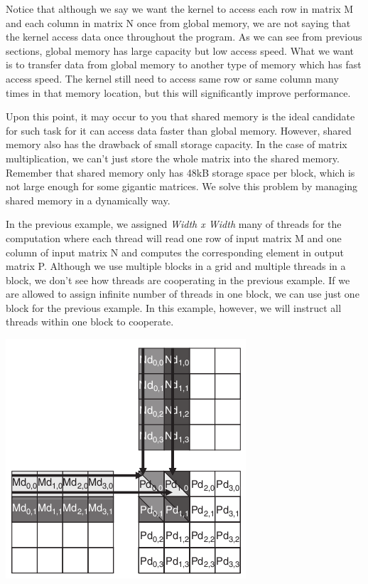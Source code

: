 \documentclass[letterpaper,10pt,english]{sphinxmanual}
\begin{document}
Notice that although we say we want the kernel to access each row in matrix M and each column in matrix N once from global memory, we are not saying that the kernel access data once throughout the program. As we can see from previous sections, global memory has large capacity but low access speed. What we want is to transfer data from global memory to another type of memory which has fast access speed. The kernel still need to access same row or same column many times in that memory location, but this will significantly improve performance.

Upon this point, it may occur to you that shared memory is the ideal candidate for such task for it can access data faster than global memory. However, shared memory also has the drawback of small storage capacity. In the case of matrix multiplication, we can't just store the whole matrix into the shared memory. Remember that shared memory only has 48kB storage space per block, which is not large enough for some gigantic matrices. We solve this problem by managing shared memory in a dynamically way.

In the previous example, we assigned \emph{Width x Width} many of threads for the computation where each thread will read one row of input matrix M and one column of input matrix N and computes the corresponding element in output matrix P. Although we use multiple blocks in a grid and multiple threads in a block, we don't see how threads are cooperating in the previous example. If we are allowed to assign infinite number of threads in one block, we can use just one block for the previous example. In this example, however, we will instruct all threads within one block to cooperate.

{\hfill\includegraphics{MMSM1.png}\hfill}
\end{document}
